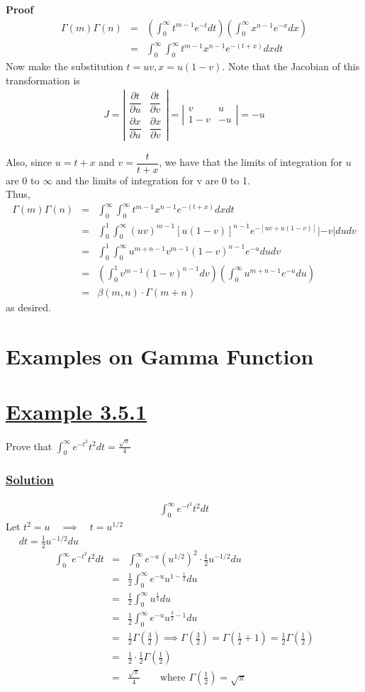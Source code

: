 \documentclass[11pt]{report}
\newcommand{\ubt}[1]{\textbf{\underline{#1}}}
\newcommand{\sps}{\\[0.2cm]}
\newcommand{\bt}[1]{\textbf{#1}}
\newcommand{\dsp}{\displaystyle}
\newcommand{\NI}{\noindent}
\newcommand{\example}[1]{\section*{\ubt{Example #1}}}
\newcommand{\solution}{\subsubsection{\ubt{Solution}}}
\begin{document}
	\NI\bt{Proof}\\
	\begin{eqnarray*}
		\Gamma(m)\Gamma(n) &=& \left(\int_0^\infty t^{m-1}e^{-t}dt\right)\left(\int_0^\infty x^{n-1}e^{-x}dx\right)\sps
		&=&\int_0^\infty\int_0^\infty t^{m-1}x^{n-1}e^{-(t+x)}dxdt
	\end{eqnarray*}
	Now make the substitution $t=uv, x = u(1-v)$. Note that the Jacobian of this transformation is
	\begin{eqnarray*}
		J = \left|
		\begin{array}{cc}
			\dfrac{\partial t}{\partial u} & \dfrac{\partial t}{\partial v}\sps
			\dfrac{\partial x}{\partial u} & \dfrac{\partial x}{\partial v}
		\end{array}\right| = 
		\left|
		\begin{array}{cc}
			v & u\sps
			1-v & -u
		\end{array}\right| = -u
	\end{eqnarray*}
	
	\NI Also, since $u=t+x$ and $v=\dfrac{t}{t+x}$, we have that the limits of integration for $u$ are 0 to $\infty$ and the limits of integration for v are 0 to 1.\\
	
	\NI Thus,
	\begin{eqnarray*}
		\Gamma(m)\Gamma(n) &=& \int_0^\infty\int_0^\infty t^{m-1}x^{n-1}e^{-(t+x)}dxdt\sps
		&=&\int_0^1\int_0^\infty (uv)^{m-1}[u(1-v)]^{n-1} e^{-[uv + u(1-v)]} |-v|dudv\sps
		&=&\int_0^1\int_0^\infty u^{m+n-1}v^{m-1}(1-v)^{n-1}e^{-u}dudv\sps
		&=&\left(\int_0^1v^{m-1}(1-v)^{n-1}dv\right)\left(\int_0^\infty u^{m+n-1}e^{-u}du\right)\sps
		&=& \beta(m,n)\cdot \Gamma(m+n)
	\end{eqnarray*}
	as desired.
	
	
	\section{Examples on Gamma Function}
	
	\example{3.5.1}
	Prove that $\dsp\int_0^\infty e^{-t^2}t^2 dt = \frac{\sqrt{\pi}}{4}$
	
	\solution
	\begin{eqnarray*}
		\int_0^\infty e^{-t^2}t^2 dt
	\end{eqnarray*}
	Let $\dsp t^2 = u \quad\implies\quad t = u^{1/2}$\\
	{~ \qquad\qquad ~}$\dsp dt = \frac{1}{2} u^{-1/2}du$
	\begin{eqnarray*}
		\int_0^\infty e^{-t^2}t^2 dt &=& \int_0^\infty e^{-u}\left(u^{1/2}\right)^2 \cdot \frac{1}{2} u^{-1/2}du\sps
		&=& \frac{1}{2}\int_0^\infty e^{-u} u^{1-\frac{1}{2}}du\sps
		&=&\frac{1}{2}\int_0^\infty u^{\frac{1}{2}} du\sps
		&=&\frac{1}{2}\int_0^\infty e^{-u} u^{\frac{3}{2}-1}du\sps
		&=&\frac{1}{2}\Gamma\left(\frac{3}{2}\right) \implies \Gamma\left(\frac{3}{2}\right) = \Gamma\left(\frac{1}{2}+1\right)=\frac{1}{2}\Gamma\left(\frac{1}{2}\right)\sps
		&=& \frac{1}{2}\cdot \frac{1}{2}\Gamma\left(\frac{1}{2}\right)\sps
		&=&\frac{\sqrt{\pi}}{4} \qquad \text{where } \Gamma\left(\frac{1}{2}\right) = \sqrt{\pi}
	\end{eqnarray*}
	
\end{document}

